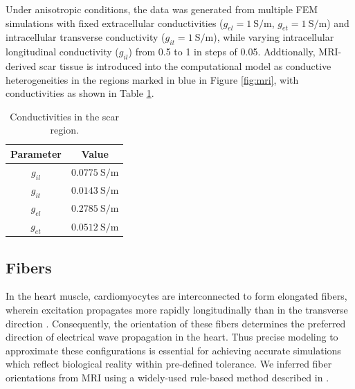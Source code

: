 Under anisotropic conditions, the data was generated from multiple FEM simulations with fixed extracellular conductivities (\(g_{el} = 1~\mathrm{S/m}\), \(g_{et} = 1~\mathrm{S/m}\)) and intracellular transverse conductivity (\(g_{it} = 1~\mathrm{S/m}\)), while varying intracellular longitudinal conductivity (\(g_{il}\)) from 0.5 to 1 in steps of 0.05. Addtionally, MRI-derived scar tissue is introduced into the computational model as conductive heterogeneities in the regions marked in blue in Figure \ref{fig:mri}, with conductivities as shown in Table \ref{tab:scar}. 
\begin{table}[H]
  \centering
  \begin{tabular}{|c|c|}
    \hline
    Parameter & Value \\ \hline
    $g_{il}$ & $0.0775~\mathrm{S/m}$ \\ \hline
    $g_{it}$ & $0.0143~\mathrm{S/m}$ \\ \hline
    $g_{el}$ & $0.2785~\mathrm{S/m}$ \\ \hline
    $g_{et}$ & $0.0512~\mathrm{S/m}$ \\ \hline
  \end{tabular}
  \caption{Conductivities in the scar region.}
  \label{tab:scar}
\end{table}


\subsection{Fibers}



In the heart muscle, cardiomyocytes are interconnected to form elongated fibers, wherein excitation propagates more rapidly longitudinally than in the transverse direction \cite{conduction_direction}. Consequently, the orientation of these fibers determines the preferred direction of electrical wave propagation in the heart. Thus precise modeling to approximate these configurations is essential for achieving accurate simulations which reflect biological reality within pre-defined tolerance. We inferred fiber orientations from MRI using a widely-used rule-based method described in \cite{Bayer2012}. 

